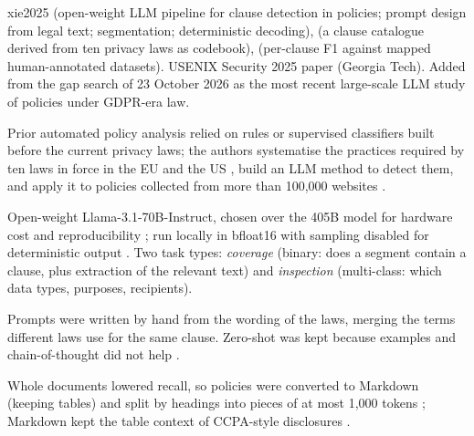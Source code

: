 \begin{papercard}{xie2025}
  (open-weight LLM pipeline for clause detection in policies; prompt design from legal text; segmentation; deterministic decoding),  (a clause catalogue derived from ten privacy laws as codebook),  (per-clause F1 against mapped human-annotated datasets). USENIX Security 2025 paper (Georgia Tech). Added from the gap search of 23 October 2026 as the most recent large-scale LLM study of policies under GDPR-era law.

 Prior automated policy analysis relied on rules or supervised classifiers built before the current privacy laws; the authors systematise the practices required by ten laws in force in the EU and the US , build an LLM method to detect them, and apply it to policies collected from more than 100,000 websites .

 Open-weight Llama-3.1-70B-Instruct, chosen over the 405B model for hardware cost and reproducibility ; run locally in bfloat16 with sampling disabled for deterministic output . Two task types: \emph{coverage} (binary: does a segment contain a clause, plus extraction of the relevant text) and \emph{inspection} (multi-class: which data types, purposes, recipients).

 Prompts were written by hand from the wording of the laws, merging the terms different laws use for the same clause. Zero-shot was kept because examples and chain-of-thought did not help .

 Whole documents lowered recall, so policies were converted to Markdown (keeping tables) and split by headings into pieces of at most 1,000 tokens ; Markdown kept the table context of CCPA-style disclosures .


\end{papercard}
